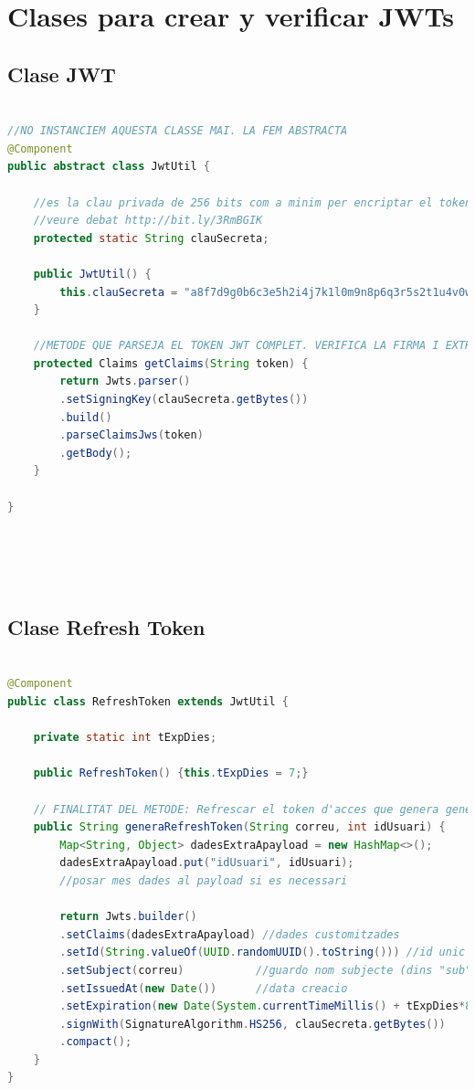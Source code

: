 \documentclass[a4paper,12pt]{report}
\begin{document}
		
		\section{Clases para crear y verificar JWTs}
		\label{sec:anexoCreacionYverificacionJWT}
	
	
\subsection{Clase JWT}


\begin{lstlisting}[language=Java, basicstyle=\ttfamily\tiny, keywordstyle=\color{magenta}]
	
//NO INSTANCIEM AQUESTA CLASSE MAI. LA FEM ABSTRACTA
@Component
public abstract class JwtUtil {
	
	//es la clau privada de 256 bits com a minim per encriptar el token (tant el d'acces com el de refresh)
	//veure debat http://bit.ly/3RmBGIK
	protected static String clauSecreta;
	
	public JwtUtil() {
		this.clauSecreta = "a8f7d9g0b6c3e5h2i4j7k1l0m9n8p6q3r5s2t1u4v0w9x8y7z";
	}
	
	//METODE QUE PARSEJA EL TOKEN JWT COMPLET. VERIFICA LA FIRMA I EXTRAU LES CLAIMS (parells clau valor en el payload).
	protected Claims getClaims(String token) {
		return Jwts.parser()
		.setSigningKey(clauSecreta.getBytes())
		.build()
		.parseClaimsJws(token)
		.getBody();
	}
	
}






\end{lstlisting}


				

\subsection{Clase Refresh Token}

\begin{lstlisting}[language=Java, basicstyle=\ttfamily\tiny, keywordstyle=\color{magenta}]

@Component
public class RefreshToken extends JwtUtil {
	
	private static int tExpDies;
	
	public RefreshToken() {this.tExpDies = 7;}
	
	// FINALITAT DEL METODE: Refrescar el token d'acces que genera generaAccesToken().
	public String generaRefreshToken(String correu, int idUsuari) {
		Map<String, Object> dadesExtraApayload = new HashMap<>();
		dadesExtraApayload.put("idUsuari", idUsuari);
		//posar mes dades al payload si es necessari
		
		return Jwts.builder()
		.setClaims(dadesExtraApayload) //dades customitzades
		.setId(String.valueOf(UUID.randomUUID().toString())) //id unic per a token. Per traSSSabilitat
		.setSubject(correu)           //guardo nom subjecte (dins "sub")
		.setIssuedAt(new Date())      //data creacio
		.setExpiration(new Date(System.currentTimeMillis() + tExpDies*86400*1000))  //expiracio
		.signWith(SignatureAlgorithm.HS256, clauSecreta.getBytes())
		.compact();
	}
}

\end{lstlisting}
\end{document}
